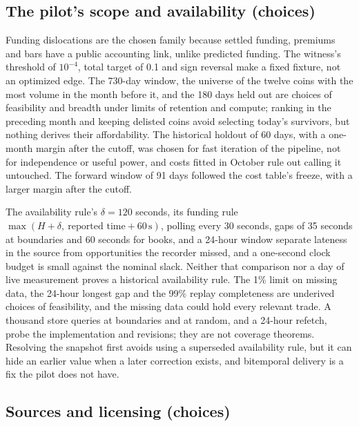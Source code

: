 \documentclass[11pt]{article}
\begin{document}
\subsection{The pilot's scope and availability (choices)}\label{app:data}

Funding dislocations are the chosen family because settled funding, premiums and bars have a public accounting link, unlike predicted funding. The witness's threshold of $10^{-4}$, total target of 0.1 and sign reversal make a fixed fixture, not an optimized edge. The 730-day window, the universe of the twelve coins with the most volume in the month before it, and the 180 days held out are choices of feasibility and breadth under limits of retention and compute; ranking in the preceding month and keeping delisted coins avoid selecting today's survivors, but nothing derives their affordability. The historical holdout of 60 days, with a one-month margin after the cutoff, was chosen for fast iteration of the pipeline, not for independence or useful power, and costs fitted in October rule out calling it untouched. The forward window of 91 days followed the cost table's freeze, with a larger margin after the cutoff.

The availability rule's $\delta=120$ seconds, its funding rule $\max(H+\delta,\ \text{reported time}+60\,\text{s})$, polling every 30 seconds, gaps of 35 seconds at boundaries and 60 seconds for books, and a 24-hour window separate lateness in the source from opportunities the recorder missed, and a one-second clock budget is small against the nominal slack. Neither that comparison nor a day of live measurement proves a historical availability rule. The 1\% limit on missing data, the 24-hour longest gap and the 99\% replay completeness are underived choices of feasibility, and the missing data could hold every relevant trade. A thousand store queries at boundaries and at random, and a 24-hour refetch, probe the implementation and revisions; they are not coverage theorems. Resolving the snapshot first avoids using a superseded availability rule, but it can hide an earlier value when a later correction exists, and bitemporal delivery is a fix the pilot does not have.

\subsection{Sources and licensing (choices)}\label{app:sources}
\end{document}
